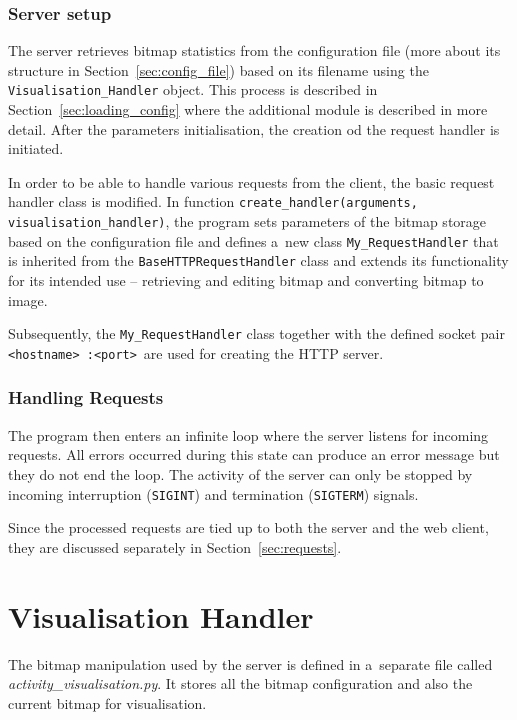 \subsubsection{Server setup}
The server retrieves bitmap statistics from the configuration file
(more about its structure in Section~\ref{sec:config_file}) based
on its filename using the \texttt{Visualisation\_Handler} object.
This process is described in Section~\ref{sec:loading_config} where the additional
module is described in more detail.
After the parameters initialisation, the creation od the request handler is initiated.

In order to be able to handle various requests from the client, the basic request handler class is modified.
In function \texttt{create\_handler(arguments, visualisation\_handler)}, the program sets parameters of the bitmap storage based on the
configuration file and defines a~new class \texttt{My\_RequestHandler} that is inherited from the \texttt{BaseHTTPRequestHandler} class
and extends its functionality for its intended use -- retrieving and editing bitmap and converting bitmap to image.

Subsequently, the \texttt{My\_RequestHandler} class together with the defined socket pair \texttt{<hostname> :<port>}~are used for creating
the HTTP server.

\subsubsection{Handling Requests}
The program then enters an infinite loop where the server listens for incoming requests. All errors occurred
during this state can produce an error message but they do not end the loop.
The activity of the server can only be stopped by incoming interruption (\texttt{SIGINT})
and termination (\texttt{SIGTERM}) signals.

Since the processed requests are tied up to both the server and the web client, they are discussed
separately in Section~\ref{sec:requests}.



\section{Visualisation Handler}\label{sec:visualisation_handler}
The bitmap manipulation used by the server is defined in a~separate file called
\textit{activity\_visualisation.py}. It stores all the bitmap configuration and
also the current bitmap for visualisation.

